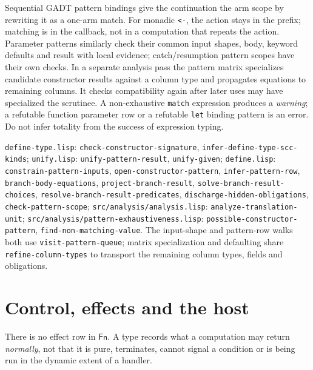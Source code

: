 \documentclass[11pt]{article}
\theoremstyle{definition}
\newcommand{\code}[1]{\texttt{#1}}
\newcommand{\src}[1]{\nolinkurl{#1}}
\newcommand{\Fn}{\mathsf{Fn}}
\begin{document}
Sequential GADT pattern bindings give the continuation the arm scope by
rewriting it as a one-arm match. For monadic \code{<-}, the action stays
in the prefix; matching is in the callback, not in a computation that
repeats the action. Parameter patterns similarly check their common
input shapes, body, keyword defaults and result with local evidence;
catch/resumption pattern scopes have their own checks. In a separate
analysis pass the pattern matrix specializes candidate constructor results
against a column type and propagates equations to remaining columns.
It checks compatibility again after later uses may have specialized
the scrutinee. A non-exhaustive \code{match} expression produces a
\emph{warning}; a refutable function parameter row or a refutable
\code{let} binding pattern is an error. Do not infer totality from the
success of expression typing.

\sources \src{define-type.lisp}: \src{check-constructor-signature},
\src{infer-define-type-scc-kinds}; \src{unify.lisp}: \src{unify-pattern-result},
\src{unify-given}; \src{define.lisp}: \src{constrain-pattern-inputs},
\src{open-constructor-pattern}, \src{infer-pattern-row}, \src{branch-body-equations},
\src{project-branch-result}, \src{solve-branch-result-choices},
\src{resolve-branch-result-predicates}, \src{discharge-hidden-obligations},
\src{check-pattern-scope}; \src{src/analysis/analysis.lisp}:
\src{analyze-translation-unit}; \src{src/analysis/pattern-exhaustiveness.lisp}:
\src{possible-constructor-pattern}, \src{find-non-matching-value}.
The input-shape and pattern-row walks both use
\src{visit-pattern-queue}; matrix specialization and defaulting share
\src{refine-column-types} to transport the remaining column types, fields
and obligations.

\section{Control, effects and the host}\label{sec:effects}
There is no effect row in $\Fn$. A type records what a computation may
return \emph{normally}, not that it is pure, terminates, cannot signal a
condition or is being run in the dynamic extent of a handler.
\end{document}
